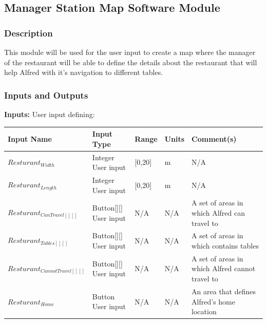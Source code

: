 \documentclass [10pt]{article}
\begin{document}

\subsection{Manager Station Map Software Module}


\subsubsection{Description}
This module will be used for the user input to create a map where the manager of the restaurant will be able to define the details about the restaurant that will help Alfred with it's navigation to different tables.


\subsubsection{Inputs and Outputs}

\textbf{Inputs:} User input defining:\\

\begin{longtable}{|l|l|l|l|l|}\hline 
	\rowcolor{tableCell}\textbf{Input Name} & \textbf{Input Type} & \textbf{Range} & \textbf{Units} & \textbf{Comment(s)} \\ \hline
	$ Resturant_{Width} $ & Integer User input &  [0,20] & m &  N/A\\ \hline
	\rowcolor{tableCell}$ Resturant_{Length} $ & Integer User input &  [0,20] & m &  N/A\\ \hline
	$ Resturant_{CanTravel[][]} $ & Button[][] User input &  N/A & N/A & A set of areas in which Alfred can travel to \\ \hline
	\rowcolor{tableCell}$ Resturant_{Tables[][]} $ & Button[][] User input &  N/A & N/A & A set of areas in which contains tables \\ \hline
	$ Resturant_{CannotTravel[][]} $ & Button[][] User input &  N/A & N/A & A set of areas in which Alfred cannot travel to \\ \hline
	\rowcolor{tableCell}$ Resturant_{Home} $ & Button User input &  N/A & N/A & An area that defines Alfred's home location \\ \hline
\end{longtable}
\end{document}
